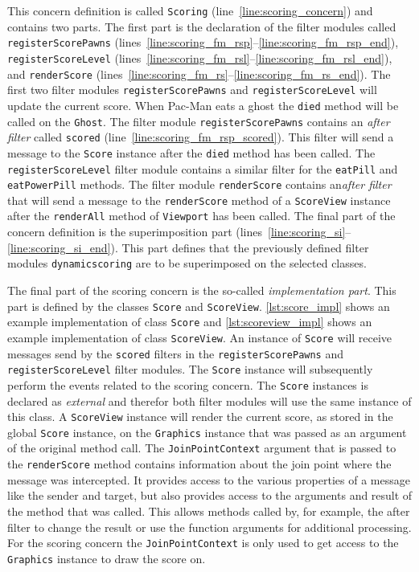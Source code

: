 This concern definition is called \lstinline|Scoring| (line~\ref{line:scoring_concern}) and contains two parts.
The first part is the declaration of the filter modules called \lstinline|registerScorePawns| (lines~\ref{line:scoring_fm_rsp}--\ref{line:scoring_fm_rsp_end}), \lstinline|registerScoreLevel| (lines~\ref{line:scoring_fm_rsl}--\ref{line:scoring_fm_rsl_end}), and \lstinline|renderScore| (lines~\ref{line:scoring_fm_rs}--\ref{line:scoring_fm_rs_end}).
The first two filter modules \lstinline|registerScorePawns| and \lstinline|registerScoreLevel| will update the current score. When Pac-Man eats a ghost the \lstinline|died| method will be called on the \lstinline|Ghost|. 
The filter module \lstinline|registerScorePawns| contains an \emph{after filter} called \lstinline|scored| (line~\ref{line:scoring_fm_rsp_scored}). 
This filter will send a message to the \lstinline|Score| instance after the \lstinline|died| method has been called. 
The \lstinline|registerScoreLevel| filter module contains a similar filter for the \lstinline|eatPill| and \lstinline|eatPowerPill| methods.
The filter module \lstinline|renderScore| contains an\emph{after filter} that will send a message to the \lstinline|renderScore| method of a \lstinline|ScoreView| instance after the \lstinline|renderAll| method of \lstinline|Viewport| has been called.
The final part of the concern definition is the superimposition part (lines~\ref{line:scoring_si}--\ref{line:scoring_si_end}).
This part defines that the previously defined filter modules \lstinline|dynamicscoring| are to be superimposed on the selected classes.

The final part of the scoring concern is the so-called \emph{implementation part}.
This part is defined by the classes \lstinline|Score| and \lstinline|ScoreView|.
\autoref{lst:score_impl} shows an example implementation of class \lstinline|Score| and \autoref{lst:scoreview_impl} shows an example implementation of class \lstinline|ScoreView|.
An instance of \lstinline|Score| will receive messages send by the \lstinline|scored| filters in the \lstinline|registerScorePawns| and \lstinline|registerScoreLevel| filter modules. 
The \lstinline|Score| instance will subsequently perform the events related to the scoring concern. The \lstinline|Score| instances is declared as \emph{external} and therefor both filter modules will use the same instance of this class.
A \lstinline|ScoreView| instance will render the current score, as stored in the global \lstinline|Score| instance, on the \lstinline|Graphics| instance that was passed as an argument of the original method call. 
The \lstinline|JoinPointContext| argument that is passed to the \lstinline|renderScore| method contains information about the join point where the message was intercepted. 
It provides access to the various properties of a message like the sender and target, but also provides access to the arguments and result of the method that was called. 
This allows methods called by, for example, the after filter to change the result or use the function arguments for additional processing. For the scoring concern the \lstinline|JoinPointContext| is only used to get access to the \lstinline|Graphics| instance to draw the score on.

